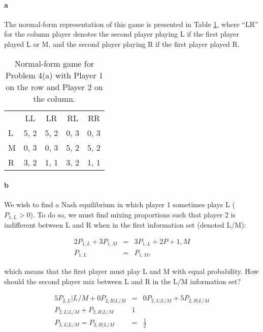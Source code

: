 \begin{answer}{4}
\paragraph{a} The normal-form representation of this game is presented in Table \ref{tab:4a}, where ``LR'' for the column player denotes the second player playing L if the first player played L or M, and the second player playing R if the first player played R.

\begin{table}[h!]
\begin{center}
\begin{tabular}{l|c|c|c|c|}
\multicolumn{1}{c}{} & \multicolumn{1}{c}{LL} & \multicolumn{1}{c}{LR} & \multicolumn{1}{c}{RL} & \multicolumn{1}{c}{RR}   \\
\cline{2-5}
L & 5, 2 & 5, 2 & 0, 3 & 0, 3 \\
\cline{2-5}
M & 0, 3 & 0, 3 & 5, 2 & 5, 2 \\
\cline{2-5}
R & 3, 2 & 1, 1 & 3, 2 & 1, 1 \\
\cline{2-5}
\end{tabular}
\caption{Normal-form game for Problem 4(a) with Player 1 on the row and Player 2 on the column.}
\label{tab:4a}
\end{center}
\end{table}


\paragraph{b} We wish to find a Nash equilibrium in which player 1 sometimes plays L ($P_{1,L}>0$). To do so, we must find mixing proportions such that player 2 is indifferent between L and R when in the first information set (denoted L/M):


\begin{eqnarray*}
2 P_{1,L} + 3 P_{1,M} &=& 3 P_{1,L} + 2 P+{1,M} \\
P_{1,L} &=& P_{1,M},
\end{eqnarray*}

which means that the first player must play L and M with equal probability. How should the second player mix between L and R in the L/M information set?

\begin{eqnarray*}
5 P_{2,L}|L/M + 0 P_{2,R|L/M} &=& 0 P_{2,L|L/M} + 5 P_{2,R|L/M} \\
P_{2,L|L/M} + P_{2,R|L/M} & 1 \\
P_{2,L|L/M} = P_{2,R|L/M} &=& \frac{1}{2}
\end{eqnarray*}


\end{answer}
